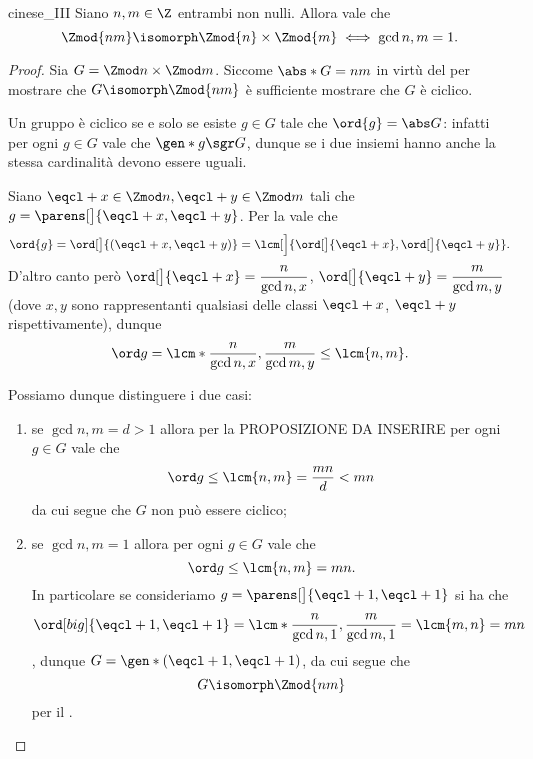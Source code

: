 \begin{theorem}
     {cinese_III}
    Siano $n, m \in \Z$ entrambi non nulli. Allora vale che \[
        \Zmod{nm} \isomorph \Zmod{n}\times \Zmod{m} \iff \gcd{n, m} = 1.
    \]
\end{theorem}
\begin{proof}
    Sia $G = \Zmod n \times \Zmod m$. Siccome $\abs*{G} = nm$ in virtù del  per mostrare che $G \isomorph \Zmod{nm}$ è sufficiente mostrare che $G$ è ciclico.

    Un gruppo è ciclico se e solo se esiste $g \in G$ tale che $\ord{g} = \abs G$: infatti per ogni $g \in G$ vale che $\gen*{g} \sgr G$, dunque se i due insiemi hanno anche la stessa cardinalità devono essere uguali.

    Siano $\eqcl+ x \in \Zmod n, \eqcl+ y \in \Zmod m$ tali che $g = \parens[\big]{\eqcl+ x, \eqcl+ y}$. Per la  vale che \[
        \ord{g} = \ord[\big]{(\eqcl+ x, \eqcl+ y)} = \lcm[\Big]{\ord[\big]{\eqcl+ x}, \ord[\big]{\eqcl+ y}}.    
    \]
    D'altro canto però $\ord[\big]{\eqcl+ x} = \dfrac{n}{\gcd{n, x}}$, $\ord[\big]{\eqcl+ y} = \dfrac{m}{\gcd{m, y}}$ (dove $x, y$ sono rappresentanti qualsiasi delle classi $\eqcl+ x$, $\eqcl+ y$ rispettivamente), dunque \[
        \ord g = \lcm*{\dfrac{n}{\gcd{n, x}}, \dfrac{m}{\gcd{m, y}}} \leq \lcm{n, m}. 
    \]

    Possiamo dunque distinguere i due casi: \begin{enumerate}
        \item se $\gcd{n, m} = d > 1$ allora per la PROPOSIZIONE DA INSERIRE per ogni $g \in G$ vale che \[
            \ord g \leq \lcm{n, m} = \frac{mn}{d} < mn    
        \] da cui segue che $G$ non può essere ciclico;
        \item se $\gcd{n, m} = 1$ allora per ogni $g \in G$ vale che \[
            \ord g \leq \lcm{n, m} = mn.    
        \] In particolare se consideriamo $g = \parens[\big]{\eqcl+ 1, \eqcl+ 1}$ si ha che \[
            \ord[big]{\eqcl+ 1, \eqcl+ 1} = \lcm*{\frac{n}{\gcd{n, 1}}, \frac{m}{\gcd{m, 1}}} = \lcm{m, n} = mn  
        \], dunque $G = \gen*{(\eqcl+ 1, \eqcl+ 1)}$, da cui segue che \[
            G \isomorph \Zmod{nm}    
        \] per il . \qedhere
    \end{enumerate} 
\end{proof}

